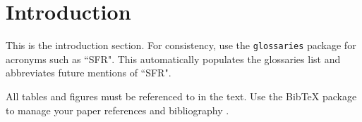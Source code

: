\section{Introduction}
\label{sec:intro}
This is the introduction section. For consistency, use the
\texttt{glossaries} package for acronyms such as ``\gls{SFR}".
This automatically populates the glossaries list and abbreviates future
mentions of ``\gls{SFR}".

All tables and figures must be referenced to in the text.
Use the BibTeX package to manage your paper references and bibliography
\cite{huff_extensions_2014}.
